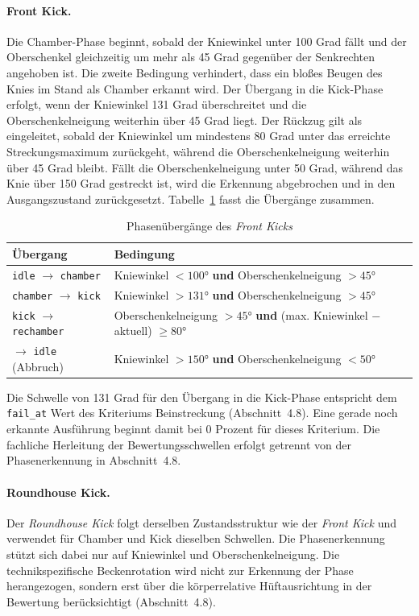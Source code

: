 \documentclass[intern]{cgMA}
\begin{document}
\paragraph{Front Kick.}
Die Chamber-Phase beginnt, sobald der Kniewinkel unter 100 Grad fällt und der Oberschenkel gleichzeitig um mehr als 45 Grad gegenüber der Senkrechten angehoben ist. Die zweite Bedingung verhindert, dass ein bloßes Beugen des Knies im Stand als Chamber erkannt wird. Der Übergang in die Kick-Phase erfolgt, wenn der Kniewinkel 131 Grad überschreitet und die Oberschenkelneigung weiterhin über 45 Grad liegt. Der Rückzug gilt als eingeleitet, sobald der Kniewinkel um mindestens 80 Grad unter das erreichte Streckungsmaximum zurückgeht, während die Oberschenkelneigung weiterhin über 45 Grad bleibt. Fällt die Oberschenkelneigung unter 50 Grad, während das Knie über 150 Grad gestreckt ist, wird die Erkennung abgebrochen und in den Ausgangszustand zurückgesetzt. Tabelle~\ref{tab:transitions_front} fasst die Übergänge zusammen.

\begin{table}[htbp]
\centering
\begin{tabular}{p{} p{}}
\hline
\textbf{Übergang} & \textbf{Bedingung} \\ \hline
\texttt{idle} $\rightarrow$ \texttt{chamber} & Kniewinkel $<100°$ \textbf{und} Oberschenkelneigung $>45°$ \\
\texttt{chamber} $\rightarrow$ \texttt{kick} & Kniewinkel $>131°$ \textbf{und} Oberschenkelneigung $>45°$ \\
\texttt{kick} $\rightarrow$ \texttt{rechamber} & Oberschenkelneigung $>45°$ \textbf{und} (max. Kniewinkel $-$ aktuell) $\geq80°$ \\
$\rightarrow$ \texttt{idle} (Abbruch) & Kniewinkel $>150°$ \textbf{und} Oberschenkelneigung $<50°$ \\ \hline
\end{tabular}
\caption{Phasenübergänge des \textit{Front Kicks}}
\label{tab:transitions_front}
\end{table}

Die Schwelle von 131 Grad für den Übergang in die Kick-Phase entspricht dem \texttt{fail\_at} Wert des Kriteriums Beinstreckung (Abschnitt~4.8). Eine gerade noch erkannte Ausführung beginnt damit bei 0 Prozent für dieses Kriterium. Die fachliche Herleitung der Bewertungsschwellen erfolgt getrennt von der Phasenerkennung in Abschnitt~4.8.

\paragraph{Roundhouse Kick.}
Der \textit{Roundhouse Kick} folgt derselben Zustandsstruktur wie der \textit{Front Kick} und verwendet für Chamber und Kick dieselben Schwellen. Die Phasenerkennung stützt sich dabei nur auf Kniewinkel und Oberschenkelneigung. Die technikspezifische Beckenrotation wird nicht zur Erkennung der Phase herangezogen, sondern erst über die körperrelative Hüftausrichtung in der Bewertung berücksichtigt (Abschnitt~4.8).
\end{document}
